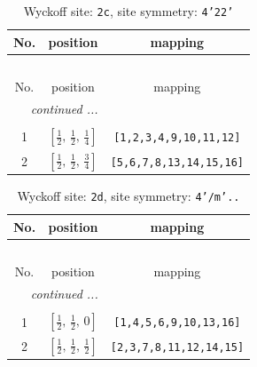\documentclass[fleqn,8pt]{jsarticle}
\begin{document}
\renewcommand{\arraystretch}{1.2}
\begin{longtable}{ccc}
\caption{Wyckoff site: {\tt 2c}, site symmetry: {\tt 4'22'}}
 \\
 \hline \hline
No. & position & mapping \\ \hline \endfirsthead

\multicolumn{2}{l}{\tablename\ \thetable{}} \\
 \hline \hline
No. & position & mapping \\ \hline \endhead

 \hline \hline
\multicolumn{2}{r}{\footnotesize\it continued ...} \\ \endfoot

 \hline \hline
\multicolumn{2}{r}{} \\ \endlastfoot

1 & $\left[ \frac{1}{2},\, \frac{1}{2},\, \frac{1}{4} \right]$ & {\tt [1,2,3,4,9,10,11,12]} \\ \hline
2 & $\left[ \frac{1}{2},\, \frac{1}{2},\, \frac{3}{4} \right]$ & {\tt [5,6,7,8,13,14,15,16]} \\
\end{longtable}
\renewcommand{\arraystretch}{1.2}
\begin{longtable}{ccc}
\caption{Wyckoff site: {\tt 2d}, site symmetry: {\tt 4'/m'..}}
 \\
 \hline \hline
No. & position & mapping \\ \hline \endfirsthead

\multicolumn{2}{l}{\tablename\ \thetable{}} \\
 \hline \hline
No. & position & mapping \\ \hline \endhead

 \hline \hline
\multicolumn{2}{r}{\footnotesize\it continued ...} \\ \endfoot

 \hline \hline
\multicolumn{2}{r}{} \\ \endlastfoot

1 & $\left[ \frac{1}{2},\, \frac{1}{2},\, 0 \right]$ & {\tt [1,4,5,6,9,10,13,16]} \\ \hline
2 & $\left[ \frac{1}{2},\, \frac{1}{2},\, \frac{1}{2} \right]$ & {\tt [2,3,7,8,11,12,14,15]} \\
\end{longtable}
\renewcommand{\arraystretch}{1.2}
\end{document}
